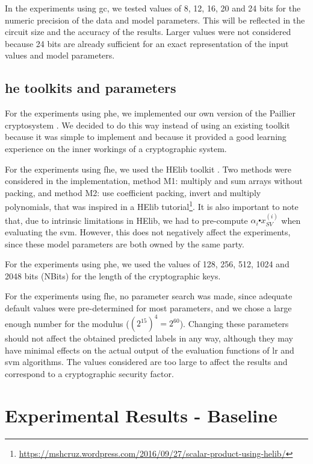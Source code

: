 In the experiments using \ac{gc}, we tested values of 8, 12, 16, 20 and 24 bits for the numeric precision of the data and model parameters. This will be reflected in the circuit size and the accuracy of the results. Larger values were not considered because 24 bits are already sufficient for an exact representation of the input values and model parameters.

\subsection{\acl{he} toolkits and parameters}

For the experiments using \ac{phe}, we implemented our own version of the Paillier cryptosystem \cite{paillier1999public}. We decided to do this way instead of using an existing toolkit because it was simple to implement and because it provided a good learning experience on the inner workings of a cryptographic system.

For the experiments using \ac{fhe}, we used the HElib toolkit \cite{halevi2014helib}. Two methods were considered in the implementation, method M1: multiply and sum arrays without packing, and method M2: use coefficient packing, invert and multiply polynomials, that was inspired in a HElib tutorial\footnote{\url{https://mshcruz.wordpress.com/2016/09/27/scalar-product-using-helib/}}. It is also important to note that, due to intrinsic limitations in HElib, we had to pre-compute $\alpha_i\centerdot x_{SV}^{(i)}$ when evaluating the \ac{svm}. However, this does not negatively affect the experiments, since these model parameters are both owned by the same party.

For the experiments using \ac{phe}, we used the values of 128, 256, 512, 1024 and 2048 bits (NBits) for the length of the cryptographic keys.

For the experiments using \ac{fhe}, no parameter search was made, since adequate default values were pre-determined for most parameters, and we chose a large enough number for the modulus ($(2^{15})^4=2^{60}$). Changing these parameters should not affect the obtained predicted labels in any way, although they may have minimal effects on the actual output of the evaluation functions of \ac{lr} and \ac{svm} algorithms. The values considered are too large to affect the results and correspond to a cryptographic security factor.


\section{Experimental Results - Baseline}
\label{sec:ExperimentalResultsBaseline}


